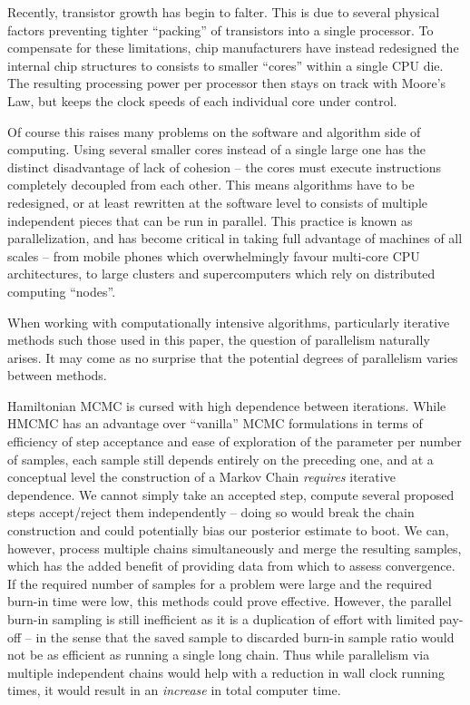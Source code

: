 	Recently, transistor growth has begin to falter. This is due to several physical factors preventing tighter ``packing'' of transistors into a single processor. To compensate for these limitations, chip manufacturers have instead redesigned the internal chip structures to consists to smaller ``cores'' within a single CPU die. The resulting processing power per processor then stays on track with Moore's Law, but keeps the clock speeds of each individual core under control.

	Of course this raises many problems on the software and algorithm side of computing. Using several smaller cores instead of a single large one has the distinct disadvantage of lack of cohesion -- the cores must execute instructions completely decoupled from each other. This means algorithms have to be redesigned, or at least rewritten at the software level to consists of multiple independent pieces that can be run in parallel. This practice is known as parallelization, and has become critical in taking full advantage of machines of all scales -- from mobile phones which overwhelmingly favour multi-core CPU architectures, to large clusters and supercomputers which rely on distributed computing ``nodes''.

	When working with computationally intensive algorithms, particularly iterative methods such those used in this paper, the question of parallelism naturally arises. It may come as no surprise that the potential degrees of parallelism varies between methods.

	Hamiltonian MCMC is cursed with high dependence between iterations. While HMCMC has an advantage over ``vanilla'' MCMC formulations in terms of efficiency of step acceptance and ease of exploration of the parameter per number of samples, each sample still depends entirely on the preceding one, and at a conceptual level the construction of a Markov Chain \textit{requires} iterative dependence. We cannot simply take an accepted step, compute several proposed steps accept/reject them independently -- doing so would break the chain construction and could potentially bias our posterior estimate to boot. We can, however, process multiple chains simultaneously and merge the resulting samples, which has the added benefit of providing data from which to assess convergence. If the required number of samples for a problem were large and the required burn-in time were low, this methods could prove effective. However, the parallel burn-in sampling is still inefficient as it is a duplication of effort with limited pay-off -- in the sense that the saved sample to discarded burn-in sample ratio would not be as efficient as running a single long chain. Thus while parallelism via multiple independent chains would help with a reduction in wall clock running times, it would result in an \textit{increase} in total computer time.

